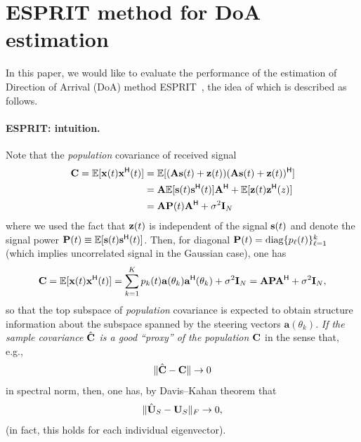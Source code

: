 \documentclass[11pt,a4paper]{article}
\begin{document}
\section{ESPRIT method for DoA estimation}

In this paper, we would like to evaluate the performance of the estimation of Direction of Arrival (DoA) method ESPRIT~\cite{paulraj1986subspace}, the idea of which is described as follows.


\paragraph{ESPRIT: intuition.}

Note that the \emph{population} covariance of received signal
\begin{align*}
		{\mathbf{C}} = {\mathbb{E}}[\mathbf{x}(t) \mathbf{x}^{\sf H}(t)] &= {\mathbb{E}}[({\mathbf{A}} \mathbf{s}(t)+ \mathbf{z}(t)) ({\mathbf{A}} \mathbf{s}(t)+ \mathbf{z}(t))^{\sf H}] \\ 
		&= {\mathbf{A}} {\mathbb{E}}[\mathbf{s}(t) \mathbf{s}^{\sf H}(t)] {\mathbf{A}}^{\sf H} + {\mathbb{E}}[\mathbf{z}(t) \mathbf{z}^{\sf H}(z)] \\ 
		&= {\mathbf{A}} {\mathbf{P}}(t) {\mathbf{A}}^{\sf H} + \sigma^2 \mathbf{I}_N
\end{align*}
where we used the fact that $\mathbf{z}(t)$ is independent of the signal $\mathbf{s}(t)$ and denote the signal power ${\mathbf{P}}(t) \equiv {\mathbb{E}}[\mathbf{s}(t) \mathbf{s}^{\sf H}(t)]$.
Then, for diagonal ${\mathbf{P}}(t) = \operatorname{diag}\{p_\ell(t) \}_{\ell=1}^k$ (which implies uncorrelated signal in the Gaussian case), one has 
\begin{equation}
	{\mathbf{C}}= {\mathbb{E}}[\mathbf{x}(t) \mathbf{x}^{\sf H}(t)] = \sum_{k=1}^K p_k(t) \mathbf{a}(\theta_k) \mathbf{a}^{\sf H}(\theta_k) + \sigma^2 \mathbf{I}_N = {\mathbf{A}} {\mathbf{P}} {\mathbf{A}}^{\sf H} + \sigma^2 \mathbf{I}_N,
\end{equation}
so that the top subspace of \emph{population} covariance is expected to obtain structure information about the subspace spanned by the steering vectors $\mathbf{a}(\theta_k)$. \emph{If the sample covariance $\hat {{\mathbf{C}}}$ is a good ``proxy'' of the population ${\mathbf{C}}$} in the sense that, e.g.,
\begin{equation}\label{eq:cov-estimation}
	\| \hat {{\mathbf{C}}} - {\mathbf{C}} \| \to 0
\end{equation}
in spectral norm, then, one has, by Davis–Kahan theorem that
\begin{equation}
	\| \hat {{\mathbf{U}}}_S - {\mathbf{U}}_S \|_F \to 0,
\end{equation}
(in fact, this holds for each individual eigenvector).
\end{document}
